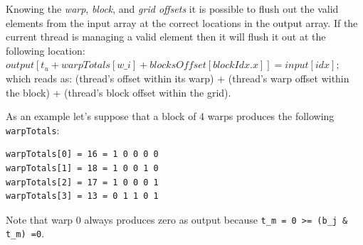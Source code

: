 Knowing the \textit{warp}, \textit{block}, and \textit{grid offsets} it is possible to flush out the valid elements from the input array at the correct locations in the output array. If the current thread is managing a valid element then it will flush it out at the following location: 
$	output[t_u+warpTotals[w\_i]+blocksOffset[blockIdx.x]]= input[idx];$
which reads as: (thread's offset within its warp) + (thread's warp offset within the block) + (thread's block offset within the grid).


As an example let’s suppose that a block of 4 warps produces the following \verb|warpTotals|:

\begin{verbatim}
warpTotals[0] = 16 = 1 0 0 0 0 
warpTotals[1] = 18 = 1 0 0 1 0
warpTotals[2] = 17 = 1 0 0 0 1
warpTotals[3] = 13 = 0 1 1 0 1
\end{verbatim}
Note that warp $0$ always produces zero as output because \verb|t_m = 0 >= (b_j & t_m) =0|.


